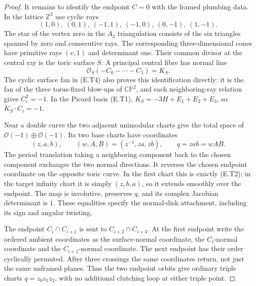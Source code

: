 \begin{proof}
It remains to identify the endpoint $C=0$ with the framed
plumbing data.  In the lattice $\mathbb Z^2$ use cyclic rays
\[
 (1,0),\ (0,1),\ (-1,1),\ (-1,0),\ (0,-1),\ (1,-1).
 \tag{E.T4}
\]
The star of the vertex zero in the $A_2$ triangulation consists
of the six triangles spanned by zero and consecutive rays.
The corresponding three-dimensional cones have primitive rays
$(v,1)$ and determinant one.  Their common divisor at the
central ray is the toric surface $S$.  A principal central
fibre has normal line
\[
             \mathcal O_S(-C_0-\cdots-C_5)=K_S.
 \tag{E.T5}
\]
The cyclic surface fan in (E.T4) also proves this identification
directly: it is the fan of the three torus-fixed blow-ups of
$\mathbb {CP}^2$, and each neighboring-ray relation gives
$C_i^2=-1$.  In the Picard basis (E.T1),
$K_S=-3H+E_1+E_2+E_3$, so $K_S\cdot C_i=-1$.

Near a double curve the two adjacent unimodular charts give
the total space of $\mathcal O(-1)\oplus\mathcal O(-1)$.
Its two base charts have coordinates
\[
 (z,a,b),\qquad
 (w,A,B)=(z^{-1},za,zb),\qquad q=zab=wAB.
 \tag{E.T6}
\]
The period translation taking a neighboring component back
to the chosen component exchanges the two normal directions.
It reverses the chosen endpoint coordinate on the opposite
toric curve.  In the first chart this is exactly (E.T2);
in the target infinity chart it is simply $(z,b,a)$, so it
extends smoothly over the endpoint.  The map is involutive,
preserves $q$, and its complex Jacobian determinant is $1$.
These equalities specify the normal-disk attachment, including
its sign and angular twisting.

The endpoint $C_i\cap C_{i+1}$ is sent to
$C_{i+2}\cap C_{i+3}$.  At the first endpoint write the
ordered ambient coordinates as the surface-normal coordinate,
the $C_i$-normal coordinate and the $C_{i+1}$-normal coordinate.
The next endpoint has their order cyclically permuted.
After three crossings the same coordinates return, not just
the same unframed planes.  Thus the two endpoint orbits give
ordinary triple charts $q=z_0z_1z_2$, with no additional
clutching loop at either triple point.


\end{proof}
